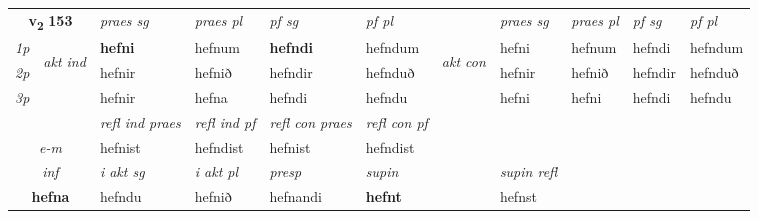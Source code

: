 \noindent
\begin{tabular}{lllllllllll} \toprule
\multicolumn{2}{c}{\textbf{v{\textsubscript{2}}} \Large{\textbf{153}}}  &  \textit{praes sg}  & \textit{praes pl}  &\textit{ pf sg} & \textit{pf pl} &  &  \textit{praes sg}  & \textit{praes pl}  & \textit{pf sg} & \textit{pf pl } \\*
	\cmidrule{3-6} \cmidrule{8-11}
 {\textit{1p}} & \multirow{3}{*}{\begin{turn}{90}\textit{akt ind}\end{turn}} & \textbf{hefni} & hefnum & \textbf{hefndi} & hefndum & \multirow{3}{*}{\begin{turn}{90}\textit{akt con}\end{turn}} &hefni & hefnum & hefndi & hefndum\\*
 {\textit{2p}} &  &  hefnir  & hefnið & hefndir & hefnduð & & hefnir & hefnið & hefndir & hefnduð \\*
{\textit{3p}} &  & hefnir & hefna & hefndi & hefndu & & hefni & hefni& hefndi & hefndu \\*
\cmidrule{3-6} \cmidrule{8-11}

 & & \textit{refl ind praes} & \textit{refl ind pf} & \textit{refl con praes} & \textit{refl con pf} \\*
 \multicolumn{2}{c}{ \textit{e-m} }& hefnist & hefndist & hefnist & hefndist \\*

\cmidrule{3-8}
   \multicolumn{2}{c}{\textit{inf}}  & \textit{i akt sg} & \textit{i akt pl}   & \textit{presp} & \textit{supin} && \textit{supin refl}  \\*
  \multicolumn{2}{c}{\textbf{hefna}} & hefndu  & hefnið   & hefnandi &  \textbf{hefnt} && hefnst  \\*
\end{tabular}

